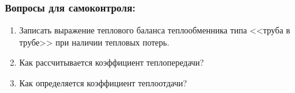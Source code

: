  
%		 


\subsubsection*{Вопросы для самоконтроля:}
\begin{enumerate}
	\item Записать выражение теплового баланса теплообменника типа <<труба в трубе>> при наличии тепловых потерь.
	\item Как рассчитывается коэффициент теплопередачи?
	\item Как определяется коэффициент теплоотдачи?
\end{enumerate}



